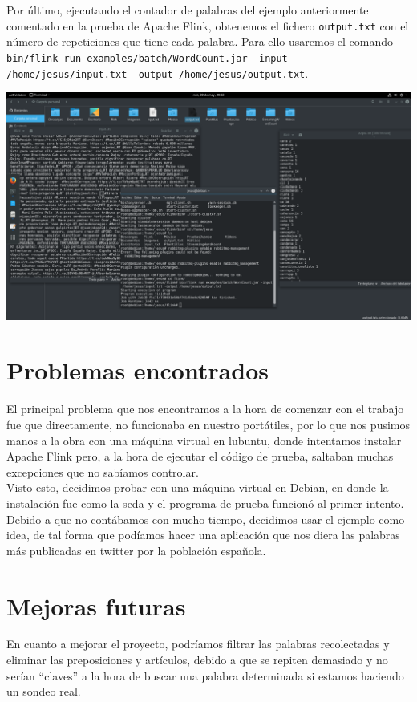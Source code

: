 \documentclass[12pt,letterpaper]{article}
\begin{document}
Por último, ejecutando el contador de palabras del ejemplo anteriormente comentado en la prueba de Apache Flink, obtenemos el fichero \texttt{output.txt} con el número de repeticiones que tiene cada palabra. Para ello usaremos el comando \texttt{bin/flink run examples/batch/WordCount.jar -input /home/jesus/input.txt -output /home/jesus/output.txt}.
\begin{center}
	\includegraphics[scale=0.24]{18.png}
\end{center}

\section{Problemas encontrados}
El principal problema que nos encontramos a la hora de comenzar con el trabajo fue que directamente, no funcionaba en nuestro portátiles, por lo que nos pusimos manos a la obra con una máquina virtual en lubuntu, donde intentamos instalar Apache Flink pero, a la hora de ejecutar el código de prueba, saltaban muchas excepciones que no sabíamos controlar.\\

Visto esto, decidimos probar con una máquina virtual en Debian, en donde la instalación fue como la seda y el programa de prueba funcionó al primer intento.\\

Debido a que no contábamos con mucho tiempo, decidimos usar el ejemplo como idea, de tal forma que podíamos hacer una aplicación que nos diera las palabras más publicadas en twitter por la población española.

\section{Mejoras futuras}
En cuanto a mejorar el proyecto, podríamos filtrar las palabras recolectadas y eliminar las preposiciones y artículos, debido a que se repiten demasiado y no serían ``claves'' a la hora de buscar una palabra determinada si estamos haciendo un sondeo real.\\
\end{document}
